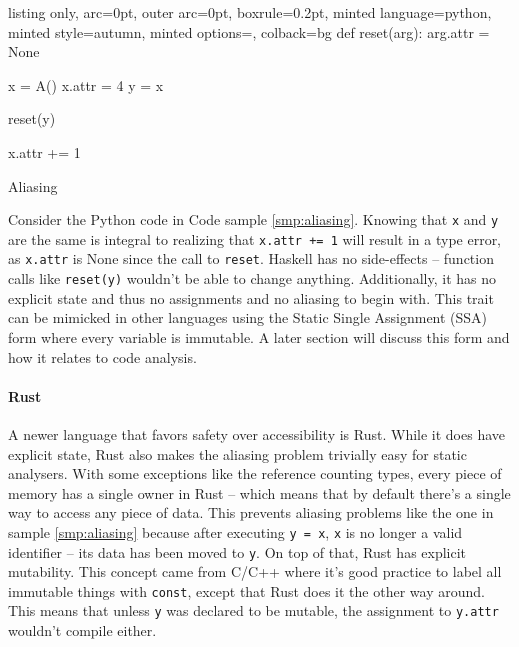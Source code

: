 \documentclass[]{article}
\let\oldparagraph\paragraph
\renewcommand{\paragraph}[1]{\oldparagraph{#1}\mbox{}}
\begin{document}
\begin{code}
  \begin{tcblisting}{listing only, 
  arc=0pt,
  outer arc=0pt, 
  boxrule=0.2pt,
  minted language=python,
  minted style=autumn,
  minted options={},
  colback=bg }
def reset(arg):
  arg.attr = None

x = A()
x.attr = 4
y = x

reset(y)

x.attr += 1
\end{tcblisting}
\caption{Aliasing}\label{smp:aliasing}
\end{code}

Consider the Python code in Code sample \ref{smp:aliasing}. Knowing that
\texttt{x} and \texttt{y} are the same is integral to realizing that
\texttt{x.attr\ +=\ 1} will result in a type error, as \texttt{x.attr}
is None since the call to \texttt{reset}. Haskell has no side-effects --
function calls like \texttt{reset(y)} wouldn't be able to change
anything. Additionally, it has no explicit state and thus no assignments
and no aliasing to begin with. This trait can be mimicked in other
languages using the Static Single Assignment (SSA) form where every
variable is immutable. A later section will discuss this form and how it
relates to code analysis.

\paragraph{Rust}\label{rust}

A newer language that favors safety over accessibility is Rust. While it
does have explicit state, Rust also makes the aliasing problem trivially
easy for static analysers. With some exceptions like the reference
counting types, every piece of memory has a single owner in Rust --
which means that by default there's a single way to access any piece of
data. This prevents aliasing problems like the one in sample
\ref{smp:aliasing} because after executing \texttt{y\ =\ x}, \texttt{x}
is no longer a valid identifier -- its data has been moved to
\texttt{y}. On top of that, Rust has explicit mutability. This concept
came from C/C++ where it's good practice to label all immutable things
with \texttt{const}, except that Rust does it the other way around. This
means that unless \texttt{y} was declared to be mutable, the assignment
to \texttt{y.attr} wouldn't compile either.
\end{document}
